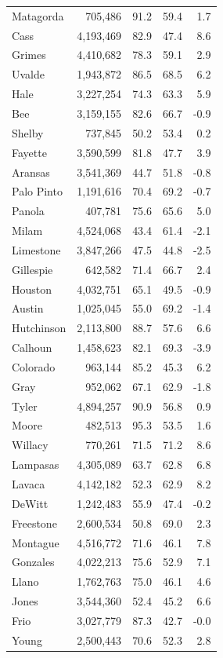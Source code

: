 \documentclass[11pt]{article}
\begin{document}
\begin{longtable}{lrrrr}
Matagorda & 705,486 & 91.2 & 59.4 & 1.7 \\
Cass & 4,193,469 & 82.9 & 47.4 & 8.6 \\
Grimes & 4,410,682 & 78.3 & 59.1 & 2.9 \\
Uvalde & 1,943,872 & 86.5 & 68.5 & 6.2 \\
Hale & 3,227,254 & 74.3 & 63.3 & 5.9 \\
Bee & 3,159,155 & 82.6 & 66.7 & -0.9 \\
Shelby & 737,845 & 50.2 & 53.4 & 0.2 \\
Fayette & 3,590,599 & 81.8 & 47.7 & 3.9 \\
Aransas & 3,541,369 & 44.7 & 51.8 & -0.8 \\
Palo Pinto & 1,191,616 & 70.4 & 69.2 & -0.7 \\
Panola & 407,781 & 75.6 & 65.6 & 5.0 \\
Milam & 4,524,068 & 43.4 & 61.4 & -2.1 \\
Limestone & 3,847,266 & 47.5 & 44.8 & -2.5 \\
Gillespie & 642,582 & 71.4 & 66.7 & 2.4 \\
Houston & 4,032,751 & 65.1 & 49.5 & -0.9 \\
Austin & 1,025,045 & 55.0 & 69.2 & -1.4 \\
Hutchinson & 2,113,800 & 88.7 & 57.6 & 6.6 \\
Calhoun & 1,458,623 & 82.1 & 69.3 & -3.9 \\
Colorado & 963,144 & 85.2 & 45.3 & 6.2 \\
Gray & 952,062 & 67.1 & 62.9 & -1.8 \\
Tyler & 4,894,257 & 90.9 & 56.8 & 0.9 \\
Moore & 482,513 & 95.3 & 53.5 & 1.6 \\
Willacy & 770,261 & 71.5 & 71.2 & 8.6 \\
Lampasas & 4,305,089 & 63.7 & 62.8 & 6.8 \\
Lavaca & 4,142,182 & 52.3 & 62.9 & 8.2 \\
DeWitt & 1,242,483 & 55.9 & 47.4 & -0.2 \\
Freestone & 2,600,534 & 50.8 & 69.0 & 2.3 \\
Montague & 4,516,772 & 71.6 & 46.1 & 7.8 \\
Gonzales & 4,022,213 & 75.6 & 52.9 & 7.1 \\
Llano & 1,762,763 & 75.0 & 46.1 & 4.6 \\
Jones & 3,544,360 & 52.4 & 45.2 & 6.6 \\
Frio & 3,027,779 & 87.3 & 42.7 & -0.0 \\
Young & 2,500,443 & 70.6 & 52.3 & 2.8 \\
\end{longtable}
\end{document}
